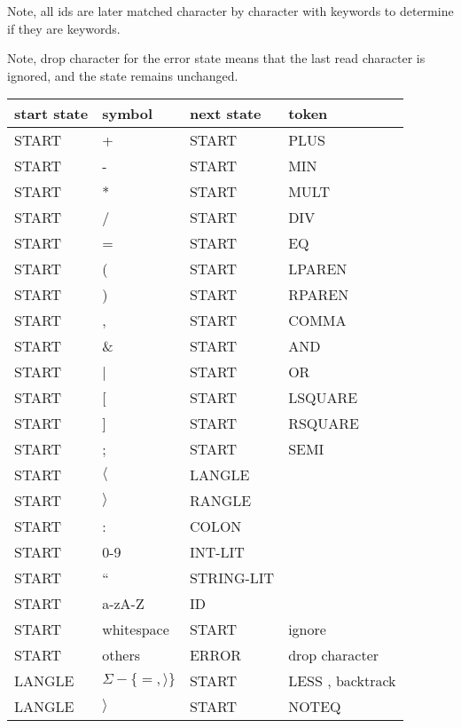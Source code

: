 \documentclass[11pt, fleqn]{article}
\begin{document}
Note, all ids are later matched character by character with keywords to determine if they are keywords.

Note, drop character for the error state means that the last read character is ignored, and the state remains unchanged.

\begin{longtable}{l|l|l|l}
start state		&	symbol						&	next	 state		&	token		 		\\
\hline
START			&	+								&	START			&	PLUS					\\
START			&	-								&	START			&	MIN					\\
START			&	*								&	START			&	MULT					\\
START			&	/								&	START			&	DIV					\\
START			&	=								&	START			&	EQ					\\
START			&	(								&	START			&	LPAREN				\\
START			&	)								&	START			&	RPAREN				\\
START			&	,								&	START			&	COMMA				\\
START			&	\&								&	START			&	AND					\\
START			&	|								&	START			&	OR					\\
START			&	[								&	START			&	LSQUARE				\\
START			&	]								&	START			&	RSQUARE				\\
START			&	;								&	START			&	SEMI					\\
START			&	$\langle$						&	LANGLE			&						\\
START			&	$\rangle$						&	RANGLE			&						\\
START			&	:								&	COLON			&						\\
START			&	0-9								&	INT-LIT			&						\\
START			&	``								&	STRING-LIT		&						\\
START			&	a-zA-Z							&	ID				&						\\
START			&	whitespace						&	START			&	ignore				\\
START			&	others							&	ERROR			&	drop character		\\
LANGLE			&	$\Sigma - \{=, \rangle\}$		&	START			&	LESS	, backtrack		\\
LANGLE			&	$\rangle$						&	START			&	NOTEQ				\\

\end{longtable}
\end{document}
